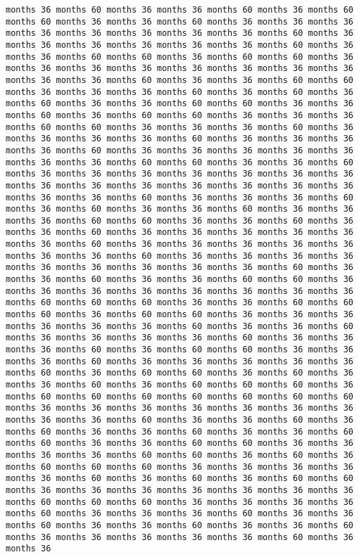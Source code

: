 \documentclass[11pt]{article}
\begin{document}
\begin{Verbatim}[commandchars=\\\{\}, frame=single, framerule=2mm, rulecolor=\color{outerrorbackground}]
months 36 months 60 months 36 months 36 months 60 months 36 months 60 months 60 months 36 months 36 months 60 months 36 months 36 months 36 months 36 months 36 months 36 months 36 months 36 months 60 months 36 months 36 months 36 months 36 months 36 months 36 months 60 months 36 months 36 months 60 months 60 months 36 months 60 months 60 months 36 months 36 months 36 months 36 months 36 months 36 months 36 months 36 months 36 months 36 months 60 months 36 months 36 months 60 months 60 months 36 months 36 months 36 months 60 months 36 months 60 months 36 months 60 months 36 months 36 months 60 months 60 months 36 months 36 months 60 months 36 months 60 months 60 months 36 months 36 months 36 months 60 months 60 months 36 months 36 months 36 months 60 months 36 months 36 months 36 months 36 months 60 months 36 months 36 months 36 months 36 months 60 months 36 months 36 months 36 months 36 months 36 months 36 months 36 months 60 months 60 months 36 months 36 months 60 months 36 months 36 months 36 months 36 months 36 months 36 months 36 months 36 months 36 months 36 months 36 months 36 months 36 months 36 months 36 months 36 months 60 months 36 months 36 months 36 months 60 months 36 months 60 months 36 months 36 months 60 months 36 months 36 months 36 months 60 months 60 months 36 months 36 months 60 months 36 months 36 months 60 months 36 months 36 months 36 months 36 months 36 months 36 months 60 months 36 months 36 months 36 months 36 months 36 months 36 months 36 months 60 months 36 months 36 months 36 months 36 months 36 months 36 months 36 months 36 months 36 months 60 months 36 months 36 months 60 months 36 months 36 months 60 months 60 months 36 months 36 months 36 months 36 months 36 months 36 months 36 months 36 months 60 months 60 months 60 months 36 months 36 months 60 months 60 months 60 months 36 months 60 months 60 months 36 months 36 months 36 months 36 months 36 months 36 months 60 months 36 months 36 months 60 months 36 months 36 months 36 months 36 months 60 months 36 months 36 months 36 months 60 months 36 months 60 months 60 months 36 months 36 months 36 months 60 months 36 months 36 months 36 months 36 months 36 months 60 months 36 months 60 months 60 months 36 months 60 months 36 months 36 months 60 months 36 months 60 months 60 months 60 months 36 months 60 months 60 months 60 months 60 months 60 months 60 months 60 months 36 months 36 months 36 months 36 months 36 months 36 months 36 months 36 months 36 months 60 months 36 months 36 months 60 months 36 months 60 months 36 months 36 months 60 months 36 months 36 months 60 months 60 months 36 months 36 months 60 months 60 months 36 months 36 months 36 months 36 months 60 months 60 months 36 months 60 months 36 months 60 months 60 months 60 months 36 months 36 months 36 months 36 months 36 months 60 months 36 months 60 months 36 months 60 months 60 months 36 months 36 months 36 months 36 months 36 months 36 months 36 months 60 months 60 months 60 months 36 months 36 months 36 months 36 months 60 months 36 months 36 months 36 months 60 months 36 months 36 months 60 months 36 months 36 months 60 months 36 months 36 months 60 months 36 months 36 months 36 months 36 months 36 months 60 months 36 months 36 
\end{Verbatim}
\end{document}
